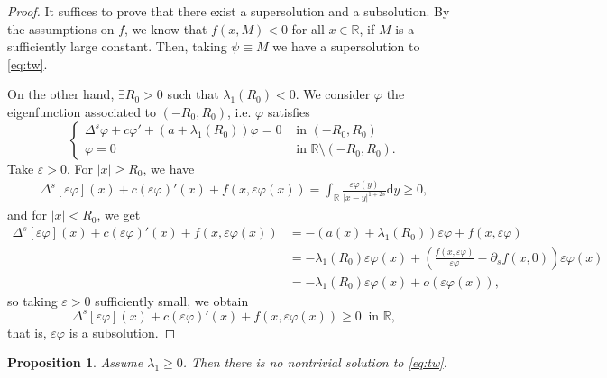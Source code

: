 \documentclass[11pt,a4paper]{amsart}
\newcommand{\R}{\mathbb{R}}
\newcommand{\inSet}[1]{\text{ in } {#1}}
\newcommand{\dy}{\mathrm{d}y}
\renewcommand{\phi}{\varphi}
\renewcommand{\epsilon}{\varepsilon}
\newtheorem{prop}[thm]{Proposition}
\begin{document}
\begin{proof}
It suffices to prove that there exist a supersolution and a subsolution. By the assumptions on $f$, we know that $f(x,M) < 0$ for all $x\in \R$, if $M$ is a sufficiently large constant. Then, taking $\psi \equiv M$ we have a supersolution to \eqref{eq:tw}.

On the other hand, $\exists R_0 >0$ such that $\lambda_1(R_0) < 0$. We consider $\phi$ the eigenfunction associated to $(-R_0, R_0)$, i.e. $\phi$ satisfies
\[\begin{cases}
\Delta^s \phi + c\phi' + (a + \lambda_1(R_0))\phi = 0 & \inSet{(-R_0,R_0)} \\
\phi = 0 & \inSet{\R\setminus(-R_0,R_0)}.
\end{cases}\]
Take $\epsilon > 0$. For  $|x| \geq R_0$, we have 
\begin{align*}
\Delta^s [\epsilon\phi](x) + c(\epsilon\phi)'(x) + f(x,\epsilon\phi(x)) = \int_{\R} \frac{\epsilon\phi(y)}{|x-y|^{1+2s}} \dy \geq 0, 
\end{align*}
and for $|x|< R_0$, we get
\begin{align*}
\Delta^s [\epsilon\phi](x) + c(\epsilon\phi)'(x) + f(x,\epsilon\phi(x)) &= -(a(x) + \lambda_1(R_0))\epsilon\phi + f(x,\epsilon\phi)\\
&= -\lambda_1(R_0) \epsilon\phi(x) + \left( \frac{f(x,\epsilon\phi)}{\epsilon\phi} - \partial_s f(x,0)\right)\epsilon \phi(x) \\
&= -\lambda_1(R_0) \epsilon\phi(x) + o(\epsilon \phi(x)),
\end{align*}
so taking $\epsilon>0$ sufficiently small, we obtain
\[\Delta^s [\epsilon\phi](x) + c(\epsilon\phi)'(x) + f(x,\epsilon\phi(x)) \geq 0 ~\inSet{\R},\]
that is, $\epsilon \phi$ is a subsolution.
\end{proof}

\begin{prop}
Assume $\lambda_1 \geq 0$. Then there is no nontrivial solution to \eqref{eq:tw}.
\end{prop}
\end{document}
